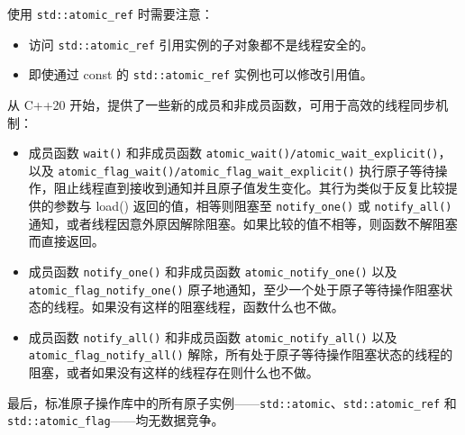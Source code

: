 使用 \verb|std::atomic_ref| 时需要注意：

\begin{itemize}
\item
访问 \verb|std::atomic_ref| 引用实例的子对象都不是线程安全的。

\item
即使通过 const 的 \verb|std::atomic_ref| 实例也可以修改引用值。
\end{itemize}

从 C++20 开始，提供了一些新的成员和非成员函数，可用于高效的线程同步机制：

\begin{itemize}
\item
成员函数 \verb|wait()| 和非成员函数 \verb|atomic_wait()/atomic_wait_explicit()|，以及 \verb|atomic_flag_wait()/atomic_flag_wait_explicit()| 执行原子等待操作，阻止线程直到接收到通知并且原子值发生变化。其行为类似于反复比较提供的参数与 load() 返回的值，相等则阻塞至 \verb|notify_one()| 或 \verb|notify_all()| 通知，或者线程因意外原因解除阻塞。如果比较的值不相等，则函数不解阻塞而直接返回。

\item
成员函数 \verb|notify_one()| 和非成员函数 \verb|atomic_notify_one()| 以及 \verb|atomic_flag_notify_one()| 原子地通知，至少一个处于原子等待操作阻塞状态的线程。如果没有这样的阻塞线程，函数什么也不做。

\item
成员函数 \verb|notify_all()| 和非成员函数 \verb|atomic_notify_all()| 以及 \verb|atomic_flag_notify_all()| 解除，所有处于原子等待操作阻塞状态的线程的阻塞，或者如果没有这样的线程存在则什么也不做。
\end{itemize}

最后，标准原子操作库中的所有原子实例——\verb|std::atomic|、\verb|std::atomic_ref| 和 \verb|std::atomic_flag|——均无数据竞争。



